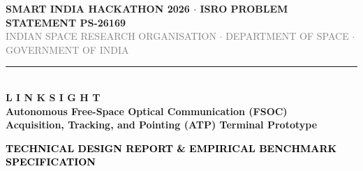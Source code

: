 \documentclass[11pt,a4paper]{article}
\begin{document}
\begin{titlepage}
  \thispagestyle{empty}
  \vspace*{-0.8cm}
  
  \begin{center}
    {\footnotesize \textbf{\textcolor{darkslate}{SMART INDIA HACKATHON 2026 $\cdot$ ISRO PROBLEM STATEMENT PS-26169}}}\\[0.10cm]
    {\scriptsize \textcolor{gray}{INDIAN SPACE RESEARCH ORGANISATION $\cdot$ DEPARTMENT OF SPACE $\cdot$ GOVERNMENT OF INDIA}}\\[0.25cm]
    \rule{\linewidth}{1.2pt}\\[0.4cm]
    
    {\fontsize{32pt}{36pt}\selectfont \textbf{\textcolor{isroblue}{L I N K S I G H T}}}\\[0.25cm]
    {\Large \textbf{Autonomous Free-Space Optical Communication (FSOC)}}\\[0.12cm]
    {\large \textbf{Acquisition, Tracking, and Pointing (ATP) Terminal Prototype}}\\[0.4cm]
    
    \begin{tcolorbox}[
      colback=lightgraybg,
      colframe=isroblue,
      width=0.98\linewidth,
      arc=1.2mm,
      boxrule=0.9pt,
      top=5pt,bottom=5pt,left=8pt,right=8pt
    ]
      \centering
      {\large \textbf{\textcolor{black}{TECHNICAL DESIGN REPORT \& EMPIRICAL BENCHMARK SPECIFICATION}}}
    \end{tcolorbox}
  \end{center}
  
  \vspace{0.15cm}
  

\end{titlepage}
\end{document}
